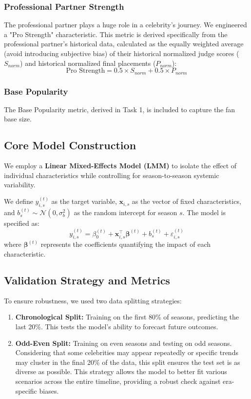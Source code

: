 \subsubsection{Professional Partner Strength}
The professional partner plays a huge role in a celebrity's journey. We engineered a "Pro Strength" characteristic. This metric is derived specifically from the professional partner's historical data, calculated as the equally weighted average (avoid introducing subjective bias) of their historical normalized judge scores ($S_{norm}$) and historical normalized final placements ($P_{norm}$):
\begin{equation}
\text{Pro Strength} = 0.5 \times S_{norm} + 0.5 \times P_{norm}
\end{equation}
\subsubsection{Base Popularity}
The Base Popularity metric, derived in Task 1, is included to capture the fan base size.

\subsection{Core Model Construction}
We employ a \textbf{Linear Mixed-Effects Model (LMM)} to isolate the effect of individual characteristics while controlling for season-to-season systemic variability.

We define $y_{i,s}^{(t)}$ as the target variable, $\mathbf{x}_{i,s}$ as the vector of fixed characteristics, and $b_s^{(t)} \sim \mathcal{N}(0, \sigma_b^2)$ as the random intercept for season $s$. The model is specified as:
\begin{equation}
 y_{i,s}^{(t)} = \beta_0^{(t)} + \mathbf{x}_{i,s}^{\top} \boldsymbol{\beta}^{(t)} + b_s^{(t)} + \varepsilon_{i,s}^{(t)}
\end{equation}
where $\boldsymbol{\beta}^{(t)}$ represents the coefficients quantifying the impact of each characteristic.

\subsection{Validation Strategy and Metrics}
To ensure robustness, we used two data splitting strategies:
\begin{enumerate}
    \item \textbf{Chronological Split:} Training on the first 80\% of seasons, predicting the last 20\%. This tests the model's ability to forecast future outcomes.
    \item \textbf{Odd-Even Split:} Training on even seasons and testing on odd seasons. Considering that some celebrities may appear repeatedly or specific trends may cluster in the final 20\% of the data, this split ensures the test set is as diverse as possible. This strategy allows the model to better fit various scenarios across the entire timeline, providing a robust check against era-specific biases.
\end{enumerate}

